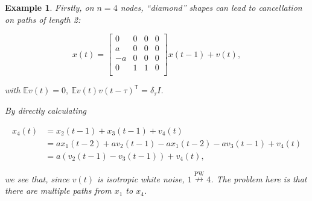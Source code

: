 \documentclass{statsoc}
\def\npwgc{\overset{\text{PW}}{\nrightarrow}}  %
\newtheorem{example}{Example}
\def\E{\mathbb{E}}  %
\def\T{\mathsf{T}}  %
\begin{document}
\begin{example}
  \label{ex:diamond_cancellation}
  Firstly, on $n = 4$ nodes, ``diamond'' shapes can lead to cancellation on paths of length 2:

\begin{equation*}
  x(t) =
  \left[
    \begin{array}{cccc}
      0 & 0 & 0 & 0\\
      a & 0 & 0 & 0\\
      -a & 0 & 0 & 0\\
      0 & 1 & 1 & 0\\
    \end{array}
  \right] x(t - 1) + v(t),
\end{equation*}

with $\E v(t) = 0,\ \E v(t)v(t - \tau)^\T = \delta_\tau I$.

By directly calculating

\begin{align*}
  x_4(t) &= x_2(t - 1) + x_3(t - 1) + v_4(t)\\
         &= ax_1(t - 2) + av_2(t - 1) - ax_1(t - 2) -av_3(t - 1) + v_4(t)\\
         &= a(v_2(t - 1) - v_3(t - 1)) + v_4(t),
\end{align*}

we see that, since $v(t)$ is isotropic white noise, $1 \npwgc 4$.  The problem here is that there are multiple paths from $x_1$ to $x_4$.
\end{example}
\end{document}
